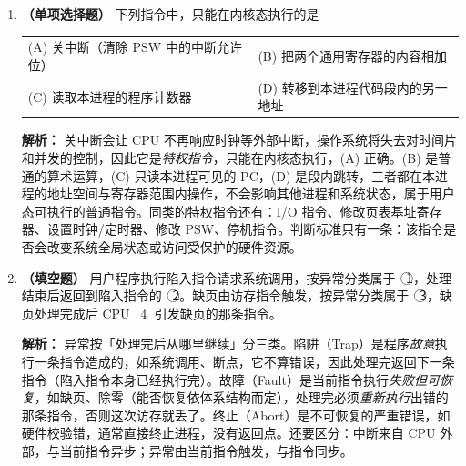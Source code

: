 \begin{enumerate}
\ifshowsolutions\par\noindent\textbf{解析：} 用户态到内核态的转换只有三条途径：中断、异常和系统调用（陷入）。(A) 除零是 CPU 执行指令时发现的同步异常，CPU 会转到异常处理程序，进入内核态。(B) \texttt{read()} 是库函数，其内部通过陷入指令发起系统调用，CPU 由用户态进入内核态执行服务例程。(C) 时钟中断是外部中断，CPU 在执行完当前指令后响应，转入内核态的中断服务程序——它也是分时与抢占式调度的基础。(D) 寄存器相加只涉及用户可见的寄存器和运算器，不访存、不请求服务、也不触发异常，CPU 始终停留在用户态。\else \answerarea \fi

\vspace{8pt}

\item \textbf{（单项选择题）} 下列指令中，只能在内核态执行的是
\begin{center}
\begin{tabular}{ll}
(A) 关中断（清除 PSW 中的中断允许位） & (B) 把两个通用寄存器的内容相加 \\[4pt]
(C) 读取本进程的程序计数器 & (D) 转移到本进程代码段内的另一地址
\end{tabular}
\end{center}

\ifshowsolutions\par\noindent\textbf{解析：} 关中断会让 CPU 不再响应时钟等外部中断，操作系统将失去对时间片和并发的控制，因此它是\emph{特权指令}，只能在内核态执行，(A) 正确。(B) 是普通的算术运算，(C) 只读本进程可见的 PC，(D) 是段内跳转，三者都在本进程的地址空间与寄存器范围内操作，不会影响其他进程和系统状态，属于用户态可执行的普通指令。同类的特权指令还有：I/O 指令、修改页表基址寄存器、设置时钟/定时器、修改 PSW、停机指令。判断标准只有一条：该指令是否会改变系统全局状态或访问受保护的硬件资源。\else \answerarea \fi

\vspace{8pt}

\item \textbf{（填空题）} 用户程序执行陷入指令请求系统调用，按异常分类属于 \underline{\hspace{2.2cm}} \ \textcircled{1}，处理结束后返回到陷入指令的 \underline{\hspace{2.2cm}} \ \textcircled{2}。缺页由访存指令触发，按异常分类属于 \underline{\hspace{2.2cm}} \ \textcircled{3}，缺页处理完成后 CPU \underline{\hspace{2.2cm}} \ \textcircled{4} 引发缺页的那条指令。

\ifshowsolutions\par\noindent\textbf{解析：} 异常按「处理完后从哪里继续」分三类。陷阱（Trap）是程序\emph{故意}执行一条指令造成的，如系统调用、断点，它不算错误，因此处理完返回下一条指令（陷入指令本身已经执行完）。故障（Fault）是当前指令执行\emph{失败但可恢复}，如缺页、除零（能否恢复依体系结构而定），处理完必须\emph{重新执行}出错的那条指令，否则这次访存就丢了。终止（Abort）是不可恢复的严重错误，如硬件校验错，通常直接终止进程，没有返回点。还要区分：中断来自 CPU 外部，与当前指令异步；异常由当前指令触发，与指令同步。\else \answerarea \fi


\end{enumerate}
